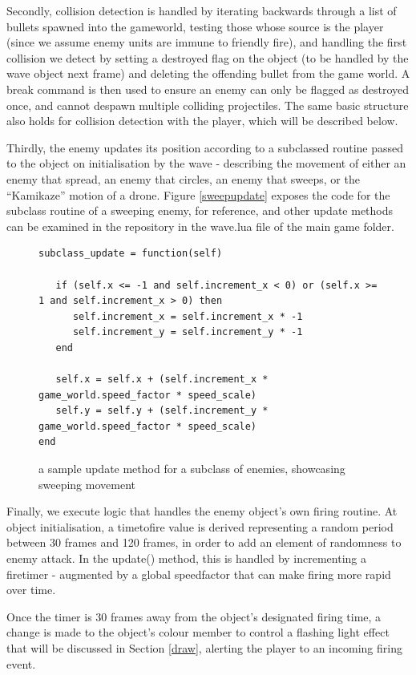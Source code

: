 \documentclass[11pt]{article}
\begin{document}
Secondly, collision detection is handled by iterating backwards through a list of bullets spawned into
the gameworld, testing those whose source is the player (since we assume enemy units are immune to friendly
fire), and handling the first collision we detect by setting a destroyed flag on the object (to be handled
by the wave object next frame) and deleting the offending bullet from the game world. A break command is then
used to ensure an enemy can only be flagged as destroyed once, and cannot despawn multiple colliding
projectiles. The same basic structure also holds for collision detection with the player, which will be
described below.

Thirdly, the enemy updates its position according to a subclassed routine passed to the object on
initialisation by the wave - describing the movement of either an enemy that spread, an enemy that circles,
an enemy that sweeps, or the ``Kamikaze'' motion of a drone. Figure \ref{sweepupdate} exposes the code
for the subclass routine of a sweeping enemy, for reference, and other update methods can be examined
in the repository in the wave.lua file of the main game folder.

\begin{figure}[h]
   \begin{lstlisting}
subclass_update = function(self)

   if (self.x <= -1 and self.increment_x < 0) or (self.x >= 1 and self.increment_x > 0) then
      self.increment_x = self.increment_x * -1
      self.increment_y = self.increment_y * -1
   end

   self.x = self.x + (self.increment_x * game_world.speed_factor * speed_scale)
   self.y = self.y + (self.increment_y * game_world.speed_factor * speed_scale)
end
   \end{lstlisting}
   \caption{a sample update method for a subclass of enemies, showcasing sweeping movement}
   \label{fig:sweepupdate}
\end{figure}

Finally, we execute logic that handles the enemy object's own firing routine. At object initialisation,
a time\textunderscore to\textunderscore fire value is derived representing a random period between
30 frames and 120 frames, in order to add an element of randomness to enemy attack. In the update()
method, this is handled by incrementing a fire\textunderscore timer - augmented by a global
speed\textunderscore factor that can make firing more rapid over time. 

Once the timer is 30 frames away from the object's designated firing time, a change is made to the
object's colour member to control a flashing light effect that will be discussed in Section \ref{draw},
alerting the player to an incoming firing event.
\end{document}
